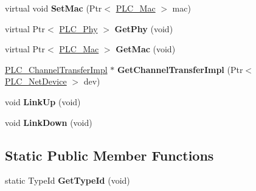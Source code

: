 \begin{DoxyCompactItemize}
\item 
\hypertarget{classns3_1_1PLC__NetDevice_aafe772acf5984f6024a6aaaad65cb5c1}{virtual void {\bfseries \-Set\-Mac} (\-Ptr$<$ \hyperlink{classns3_1_1PLC__Mac}{\-P\-L\-C\-\_\-\-Mac} $>$ mac)}\label{classns3_1_1PLC__NetDevice_aafe772acf5984f6024a6aaaad65cb5c1}

\item 
\hypertarget{classns3_1_1PLC__NetDevice_a1cbc93b7c99b318e11d3563d9511f575}{virtual \-Ptr$<$ \hyperlink{classns3_1_1PLC__Phy}{\-P\-L\-C\-\_\-\-Phy} $>$ {\bfseries \-Get\-Phy} (void)}\label{classns3_1_1PLC__NetDevice_a1cbc93b7c99b318e11d3563d9511f575}

\item 
\hypertarget{classns3_1_1PLC__NetDevice_a3569e528aa89a03c626d13cc1e458fb4}{virtual \-Ptr$<$ \hyperlink{classns3_1_1PLC__Mac}{\-P\-L\-C\-\_\-\-Mac} $>$ {\bfseries \-Get\-Mac} (void)}\label{classns3_1_1PLC__NetDevice_a3569e528aa89a03c626d13cc1e458fb4}

\item 
\hypertarget{classns3_1_1PLC__NetDevice_a4d65dbc8244983c8e926e4b1301e6cc1}{\hyperlink{classns3_1_1PLC__ChannelTransferImpl}{\-P\-L\-C\-\_\-\-Channel\-Transfer\-Impl} $\ast$ {\bfseries \-Get\-Channel\-Transfer\-Impl} (\-Ptr$<$ \hyperlink{classns3_1_1PLC__NetDevice}{\-P\-L\-C\-\_\-\-Net\-Device} $>$ dev)}\label{classns3_1_1PLC__NetDevice_a4d65dbc8244983c8e926e4b1301e6cc1}

\item 
\hypertarget{classns3_1_1PLC__NetDevice_a5a921f61ca06ec6ee859302e62210486}{void {\bfseries \-Link\-Up} (void)}\label{classns3_1_1PLC__NetDevice_a5a921f61ca06ec6ee859302e62210486}

\item 
\hypertarget{classns3_1_1PLC__NetDevice_a7e9d4b7f3700cbe993ed9d8f4e18bfcb}{void {\bfseries \-Link\-Down} (void)}\label{classns3_1_1PLC__NetDevice_a7e9d4b7f3700cbe993ed9d8f4e18bfcb}

\end{DoxyCompactItemize}
\subsection*{\-Static \-Public \-Member \-Functions}
\begin{DoxyCompactItemize}
\item 
\hypertarget{classns3_1_1PLC__NetDevice_a2314182a29ea70bd44e868b143c68602}{static \-Type\-Id {\bfseries \-Get\-Type\-Id} (void)}\label{classns3_1_1PLC__NetDevice_a2314182a29ea70bd44e868b143c68602}

\end{DoxyCompactItemize}
